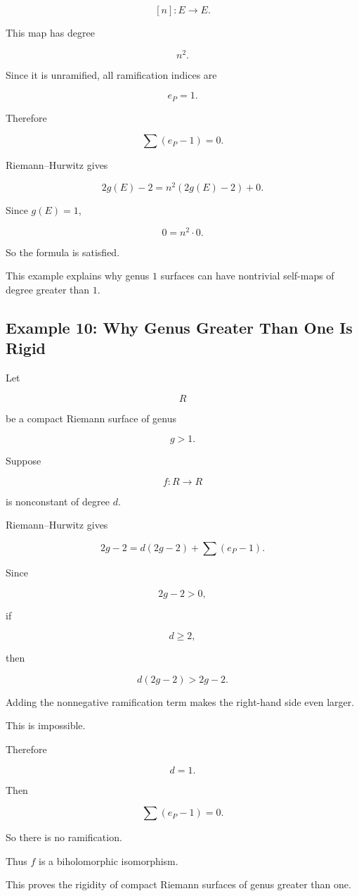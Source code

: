 \documentclass[12pt,a4paper]{article}
\theoremstyle{notespace}
\begin{document}
\[
[n]:E\to E.
\]

This map has degree

\[
n^2.
\]

Since it is unramified, all ramification indices are

\[
e_P=1.
\]

Therefore

\[
\sum(e_P-1)=0.
\]

Riemann--Hurwitz gives

\[
2g(E)-2
=
n^2(2g(E)-2)+0.
\]

Since \(g(E)=1\),

\[
0=n^2\cdot0.
\]

So the formula is satisfied.

This example explains why genus \(1\) surfaces can have nontrivial self-maps of degree greater than \(1\).

\subsection{Example 10: Why Genus Greater Than One Is Rigid}

Let

\[
R
\]

be a compact Riemann surface of genus

\[
g>1.
\]

Suppose

\[
f:R\to R
\]

is nonconstant of degree \(d\).

Riemann--Hurwitz gives

\[
2g-2=d(2g-2)+\sum(e_P-1).
\]

Since

\[
2g-2>0,
\]

if

\[
d\ge2,
\]

then

\[
d(2g-2)>2g-2.
\]

Adding the nonnegative ramification term makes the right-hand side even larger.

This is impossible.

Therefore

\[
d=1.
\]

Then

\[
\sum(e_P-1)=0.
\]

So there is no ramification.

Thus \(f\) is a biholomorphic isomorphism.

This proves the rigidity of compact Riemann surfaces of genus greater than one.
\end{document}
